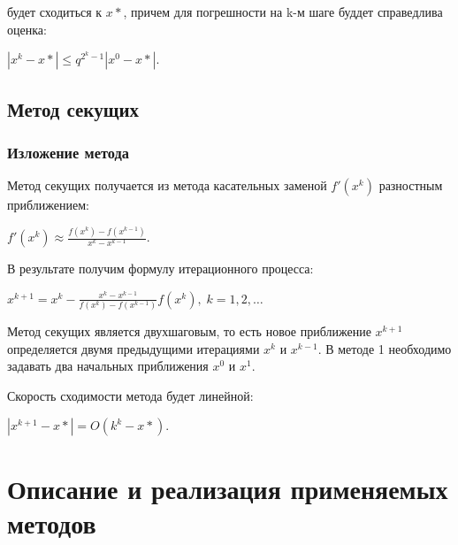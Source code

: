 \documentclass{article}
\begin{document}
				будет сходиться к $x*$, причем для погрешности на k-м шаге буддет справедлива оценка:
				
				\begin{center}$|x^k - x*| \le q^{2^k - 1}|x^0 - x*|.$\end{center}
		
		
		
		\subsection{Метод секущих}
		
			\subsubsection{Изложение метода}
			
				Метод секущих получается из метода касательных заменой $f'(x^k)$ разностным приближением:
				
				 \begin{center}$f'(x^k) \approx \frac{f(x^k)-f(x^{k-1})}{x^k-x^{k-1}}.$\end{center}
				 
				 В результате получим формулу итерационного процесса:
				 
				\begin{center} $x^{k+1}=x^k-\frac{x^k-x^{k-1}}{f(x^k)-f(x^{k-1})}f(x^k), \;k=1,2,\ldots$\end{center}
				 
				 Метод секущих является двухшаговым, то есть новое приближение $x^{k+1}$ определяется двумя предыдущими итерациями $x^k$ и $x^{k-1}.$ В методе 1 необходимо задавать два начальных приближения $x^0$ и $x^1.$
				 
				 Скорость сходимости метода будет линейной: 
				 
				 \begin{center}$|x^{k+1}-x*|=O(k^k-x*).$\end{center}
			
					


\section{Описание и реализация применяемых методов}
\end{document}
